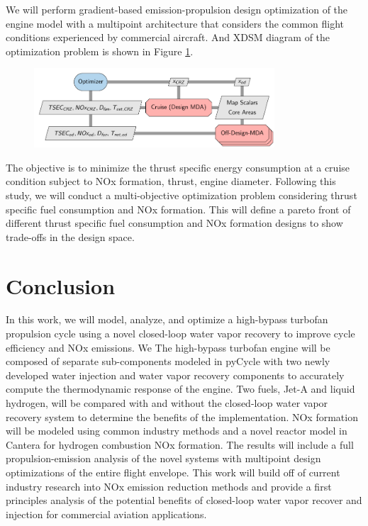 \documentclass[conf]{new-aiaa}
\begin{document}
We will perform gradient-based emission-propulsion design optimization of the engine model with a multipoint architecture that considers the common flight conditions experienced by commercial aircraft. And XDSM diagram of the optimization problem is shown in Figure \ref{fig:opt_prob}.

\begin{figure}[H]
	\centering
	\includegraphics[width=0.8\textwidth]{N3_inject.pdf}
	\caption{}
	\label{fig:opt_prob}
\end{figure}

The objective is to minimize the thrust specific energy consumption at a cruise condition subject to NOx formation, thrust, engine diameter.
Following this study, we will conduct a multi-objective optimization problem considering thrust specific fuel consumption and NOx formation.
This will define a pareto front of different thrust specific fuel consumption and NOx formation designs to show trade-offs in the design space.

\section{Conclusion}
In this work, we will model, analyze, and optimize a high-bypass turbofan propulsion cycle using a novel closed-loop water vapor recovery to improve cycle efficiency and NOx emissions. We
The high-bypass turbofan engine will be composed of separate sub-components modeled in pyCycle with two newly developed water injection and water vapor recovery components to accurately compute the thermodynamic response of the engine.
Two fuels, Jet-A and liquid hydrogen, will be compared with and without the closed-loop water vapor recovery system to determine the benefits of the implementation.
NOx formation will be modeled using common industry methods and a novel reactor model in Cantera for hydrogen combustion NOx formation.
The results will include a full propulsion-emission analysis of the novel systems with multipoint design optimizations of the entire flight envelope.
This work will build off of current industry research into NOx emission reduction methods and provide a first principles analysis of the potential benefits of closed-loop water vapor recover and injection for commercial aviation applications.


\end{document}
